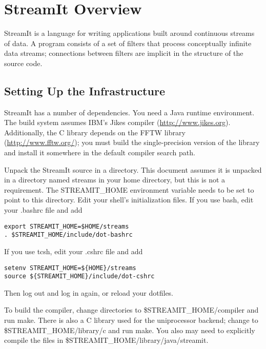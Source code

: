 \section{StreamIt Overview}

StreamIt is a language for writing applications built around
continuous streams of data.  A program consists of a set of filters
that process conceptually infinite data streams; connections between
filters are implicit in the structure of the source code.

\subsection{Setting Up the Infrastructure}

StreamIt has a number of dependencies.  You need a Java runtime
environment.  The build system assumes IBM's Jikes compiler
(\url{http://www.jikes.org}).  Additionally, the C library depends on
the FFTW library (\url{http://www.fftw.org/}); you must build the
single-precision version of the library and install it somewhere in
the default compiler search path.

Unpack the StreamIt source in a directory.  This document assumes it
is unpacked in a directory named \textsf{streams} in your home
directory, but this is not a requirement.  The \textsf{STREAMIT\_HOME}
environment variable needs to be set to point to this directory.  Edit
your shell's initialization files.  If you use \textsf{bash}, edit
your \textsf{.bashrc} file and add

\begin{verbatim}
export STREAMIT_HOME=$HOME/streams
. $STREAMIT_HOME/include/dot-bashrc
\end{verbatim}

If you use \textsf{tcsh}, edit your \textsf{.cshrc} file and add

\begin{verbatim}
setenv STREAMIT_HOME=${HOME}/streams
source ${STREAMIT_HOME}/include/dot-cshrc
\end{verbatim}

Then log out and log in again, or reload your dotfiles.

To build the compiler, change directories to
\textsf{\$STREAMIT\_HOME\slash{}com\-pi\-ler} and run \textsf{make}.
There is also a C library used for the uniprocessor backend; change to
\textsf{\$STREAMIT\_HOME\slash{}library\slash{}c} and run
\textsf{make}.  You also may need to explicitly compile the files in
\textsf{\$STREAMIT\_HOME\slash{}library\slash{}java\slash{}streamit}.

